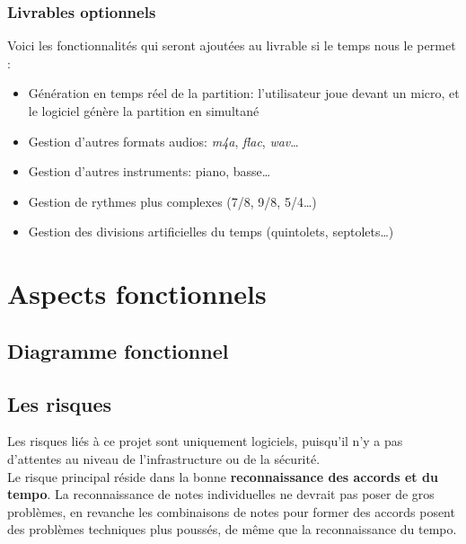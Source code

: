\documentclass[12pt]{article}
\begin{document}
\subsubsection{Livrables optionnels}

Voici les fonctionnalités qui seront ajoutées au livrable si le temps nous le permet :
\begin{itemize}
\item Génération en temps réel de la partition: l’utilisateur joue devant un micro, et le logiciel génère la partition en simultané
\item Gestion d’autres formats audios: \emph{m4a}, \emph{flac}, \emph{wav}…
\item Gestion d’autres instruments: piano, basse…
\item Gestion de rythmes plus complexes (7/8, 9/8, 5/4…)
\item Gestion des divisions artificielles du temps (quintolets, septolets…)
\end{itemize}

\newpage
\section{Aspects fonctionnels}

\subsection{Diagramme fonctionnel}

\newpage
\subsection{Les risques}

Les risques liés à ce projet sont uniquement logiciels, puisqu’il n’y a pas d’attentes au niveau de l’infrastructure ou de la sécurité.\\

Le risque principal réside dans la bonne \textbf{reconnaissance des accords et du tempo}. La reconnaissance de notes individuelles ne devrait pas poser de gros problèmes, en revanche les combinaisons de notes pour former des accords posent des problèmes techniques plus poussés, de même que la reconnaissance du tempo.\\
\end{document}

